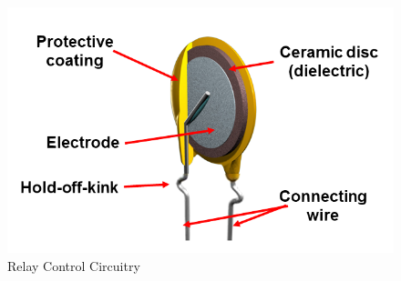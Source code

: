 \begin{figure}
\includegraphics[keepaspectratio=true,scale=.5]{./figures/testImage.png}
\centering
\caption{Relay Control Circuitry}
\label{cdlRelayCir_fig}
\end{figure}

